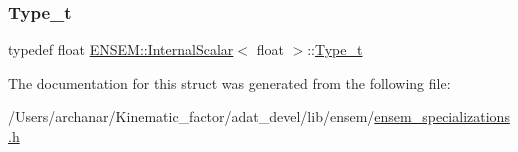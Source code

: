 \subsubsection{\texorpdfstring{Type\_t}{Type\_t}\hspace{0.1cm}{\footnotesize\ttfamily [2/2]}}
{\footnotesize\ttfamily typedef float \mbox{\hyperlink{structENSEM_1_1InternalScalar}{E\+N\+S\+E\+M\+::\+Internal\+Scalar}}$<$ float $>$\+::\mbox{\hyperlink{structENSEM_1_1InternalScalar_3_01float_01_4_a0302b6aa9102572c13ac0b2874a380f0}{Type\+\_\+t}}}



The documentation for this struct was generated from the following file\+:\begin{DoxyCompactItemize}
\item 
/\+Users/archanar/\+Kinematic\+\_\+factor/adat\+\_\+devel/lib/ensem/\mbox{\hyperlink{lib_2ensem_2ensem__specializations_8h}{ensem\+\_\+specializations.\+h}}\end{DoxyCompactItemize}
